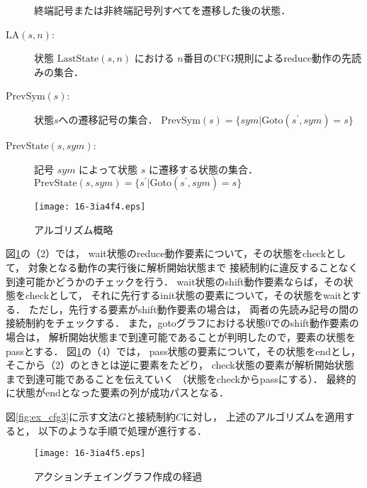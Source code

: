 \documentclass[japanese]{jnlp_1.4}
\begin{document}
\begin{description}
  終端記号または非終端記号列すべてを遷移した後の状態．
\item[$\mathrm{LA}(s,n)$:] 
  状態 $\mathrm{LastState}(s,n)$ における
  $n$番目のCFG規則によるreduce動作の先読みの集合．
\item[$\mathrm{PrevSym}(s)$:]
  状態$s$への遷移記号の集合．
  $\mathrm{PrevSym}(s)=\{\mathit{sym}|\mathrm{Goto}(s^{\prime},\mathit{sym})=s\}$
\item[$\mathrm{PrevState}(s,\mathit{sym})$:] 
  記号 $\mathit{sym}$ によって状態 $s$ に遷移する状態の集合．
  $\mathrm{PrevState}(s,\mathit{sym})=\{s^{\prime}|\mathrm{Goto}(s^{\prime},\mathit{sym})=s\}$
\end{description}

\begin{figure}[t]
\texttt{[image: 16-3ia4f4.eps]}
  \caption{アルゴリズム概略}
  \label{fig:algorithm}
\end{figure}

\noindent
図\ref{fig:algorithm}の（2）では，
wait状態のreduce動作要素について，その状態をcheckとして，
対象となる動作の実行後に解析開始状態まで
接続制約に違反することなく到達可能かどうかのチェックを行う．
wait状態のshift動作要素ならば，その状態をcheckとして，
それに先行するinit状態の要素について，その状態をwaitとする．
ただし，先行する要素がshift動作要素の場合は，
両者の先読み記号の間の接続制約をチェックする．
また，gotoグラフにおける状態0でのshift動作要素の場合は，
解析開始状態まで到達可能であることが判明したので，要素の状態をpassとする．
図\ref{fig:algorithm}の（4）では，
pass状態の要素について，その状態をendとし，
そこから（2）のときとは逆に要素をたどり，
check状態の要素が解析開始状態まで到達可能であることを伝えていく
（状態をcheckからpassにする）．
最終的に状態がendとなった要素の列が成功パスとなる．

図\ref{fig:ex_cfg3}に示す文法$G$と接続制約$C$に対し，
上述のアルゴリズムを適用すると，
以下のような手順で処理が進行する．

\begin{figure}[p]
\texttt{[image: 16-3ia4f5.eps]}
\vspace{1\baselineskip}
  \caption{アクションチェイングラフ作成の経過}
  \label{fig:chain}
\end{figure}
\end{document}

